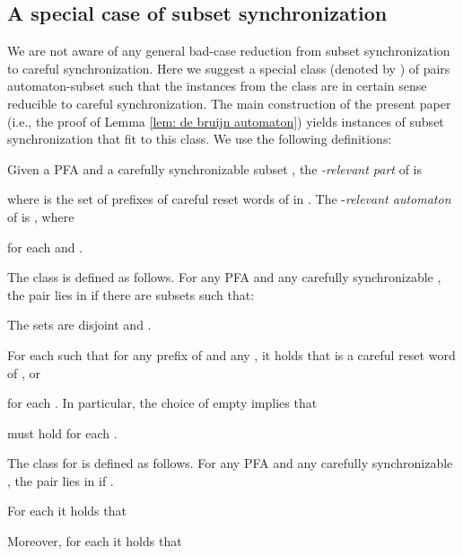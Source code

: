 \documentclass{ws-ijmpc}
\begin{document}
\subsection{A special case of subset synchronization}

We are not aware of any general bad-case reduction from subset synchronization
to careful synchronization. Here we suggest a special class (denoted
by ) of pairs automaton-subset such that
the instances from the class are in certain sense reducible to careful
synchronization. The main construction of the present paper (i.e.,
the proof of Lemma \ref{lem: de bruijn automaton}) yields instances
of subset synchronization that fit to this class. We use the following
definitions:
\begin{itemlist}
\item Given a PFA  and a carefully synchronizable
subset , the \emph{-relevant part} of  is 

where  is the set of prefixes of careful reset words of 
in . The -\emph{relevant automaton }of  is ,
where

for each  and .
\item The class  is defined as follows. For any
PFA  and any carefully synchronizable
, the pair  lies in
 if there are subsets 
such that:

\begin{itemlist}
\item The sets  are disjoint and . 
\item For each  such that 
for any prefix  of  and any , it holds that 
is a careful reset word of , or 

for each . In particular, the choice of
empty  implies that 

must hold for each .
\end{itemlist}
\item The class  for  is defined
as follows. For any PFA  and any carefully
synchronizable , the pair 
lies in  if .\end{itemlist}
\begin{lemma}
\label{lem:sub->car}For each  it holds that

Moreover, for each  it holds that 

\end{lemma}
\end{document}
